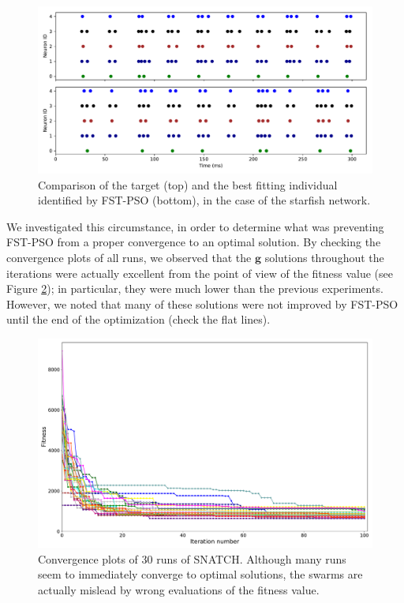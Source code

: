 \documentclass[utf8]{frontiersFPHY} %
\newcommand {\name}{SNATCH}
\begin{document}
\begin{figure}[!ht]
	\centering
	\includegraphics[width=\textwidth]{images/failed-starfish/target_sim.pdf}
	\caption{Comparison of the target (top) and the best fitting individual identified by FST-PSO (bottom), in the case of the starfish network. }
	\label{fig:target-stellona}
\end{figure}

We investigated this circumstance, in order to determine what was preventing FST-PSO from a proper convergence to an optimal solution. 
By checking the convergence plots of all runs, we observed that the $\textbf{g}$ solutions throughout the iterations were actually excellent from the point of view of the fitness value (see Figure \ref{fig:starfishall}); in particular, they were much lower than the previous experiments. 
However, we noted that many of these solutions were not improved by FST-PSO until the end of the optimization (check the flat lines).

\begin{figure}[!ht]
    \centering
    \includegraphics[width=\textwidth]{images/failed-starfish/fitness-each-optimization.pdf}
    \caption{Convergence plots of 30 runs of \name{}. Although many runs seem to immediately converge to optimal solutions, the swarms are actually mislead by wrong evaluations of the fitness value. }
    \label{fig:starfishall}
\end{figure}
\end{document}

